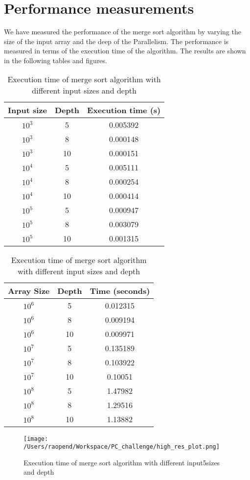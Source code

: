 \documentclass[a4paper,12pt]{report}
\begin{document}
\section*{Performance measurements}
We have measured the performance of the merge sort algorithm by varying the size of the input array and the deep of the Parallelism. The performance is measured in terms of the execution time of the algorithm. The results are shown in the following tables and figures.
\begin{table}[H]
    \caption{Execution time of merge sort algorithm with different input sizes and depth}
    \centering
    \begin{tabular}{c c c}
        \hline
        Input size & Depth & Execution time (s) \\
        \hline
        $10^3$     & 5     & 0.005392           \\
        $10^3$     & 8     & 0.000148           \\
        $10^3$     & 10    & 0.000151           \\
        $10^4$     & 5     & 0.005111           \\
        $10^4$     & 8     & 0.000254           \\
        $10^4$     & 10    & 0.000414           \\
        $10^5$     & 5     & 0.000947           \\
        $10^5$     & 8     & 0.003079           \\
        $10^5$     & 10    & 0.001315           \\
        \hline
    \end{tabular}
    \hfil
    \begin{tabular}{c c c}
        \hline
        Array Size & Depth & Time (seconds) \\
        \hline
        $10^6$     & 5     & 0.012315       \\
        $10^6$     & 8     & 0.009194       \\
        $10^6$     & 10    & 0.009971       \\
        $10^7$     & 5     & 0.135189       \\
        $10^7$     & 8     & 0.103922       \\
        $10^7$     & 10    & 0.10051        \\
        $10^8$     & 5     & 1.47982        \\
        $10^8$     & 8     & 1.29516        \\
        $10^8$     & 10    & 1.13882        \\
        \hline
    \end{tabular}
\end{table}
\begin{figure}[H]
    \centering
    \texttt{[image: /Users/raopend/Workspace/PC\_challenge/high\_res\_plot.png]}
    \caption{Execution time of merge sort algorithm with different input5sizes and depth}
\end{figure}
\end{document}
